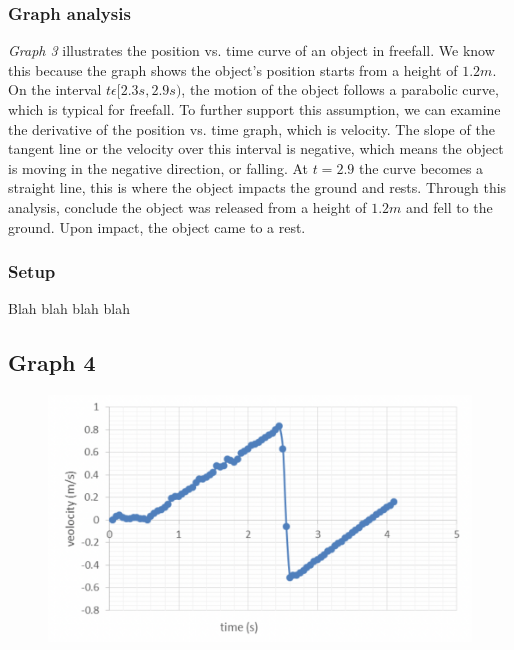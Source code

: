 \documentclass[11pt, letterpaper, includehead]{article}
\begin{document}
  \subsubsection{Graph analysis}
  \emph{Graph 3} illustrates the position vs. time curve of an object in freefall. 
  We know this because the graph shows the object's position starts from a height of 
  $1.2m$. On the interval $t\epsilon[2.3s, 2.9s)$, the motion of the object follows a 
  parabolic curve, which is typical for freefall. To further support this assumption,
  we can examine the derivative of the position vs. time graph, which is velocity. 
  The slope of the tangent line or the velocity over this interval is negative, 
  which means the object is moving in the negative direction, or falling. At $t = 2.9$ 
  the curve becomes a straight line, this is where the object impacts the ground and rests. 
  Through this analysis, conclude the object was released from a height of $1.2m$ and 
  fell to the ground. Upon impact, the object came to a rest.\\
  
  \subsubsection{Setup}
  Blah blah blah blah

  \subsection{Graph 4}

  \begin{figure}[H] %
    \centering 
    \includegraphics[width=\linewidth]{graph_4.png}
  \end{figure}
\end{document}
